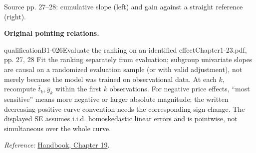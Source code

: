 {\begin{center}
\par{\small Source pp. 27--28: cumulative slope (left) and gain against a straight reference (right).}
\end{center}
\par{}\smallskip\textbf{Original pointing relations.}\par\smallskip
{}
\begin{reviewnote}{qualification}{B1-026}{Evaluate the ranking on an identified effect}{Chapter1-23.pdf, pp. 27, 28}
Fit the ranking separately from evaluation; subgroup univariate slopes are causal on a randomized evaluation sample (or with valid adjustment), not merely because the model was trained on observational data. At each $k$, recompute $\bar t_k,\bar y_k$ within the first $k$ observations. For negative price effects, ``most sensitive'' means more negative or larger absolute magnitude; the written decreasing-positive-curve convention needs the corresponding sign change. The displayed SE assumes i.i.d. homoskedastic linear errors and is pointwise, not simultaneous over the whole curve.
\par\smallskip\textit{Reference:} \href{https://matheusfacure.github.io/python-causality-handbook/19-Evaluating-Causal-Models.html}{Handbook, Chapter 19}.
\end{reviewnote}
}
